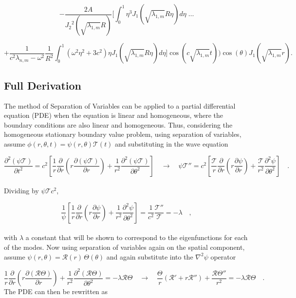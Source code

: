 \documentclass{homework}
\begin{document}
$$ - \frac{2A}{{J_2}^2 \left( \sqrt{\lambda_{1,m}} R \right)}\Bigg[ \int_0^1 \eta^3 J_1 \left( \sqrt{\lambda_{1,m}} R\eta \right) d\eta \; \dots $$

$$ + \frac{1}{c^2 \lambda_{n,m} - \omega^2} \frac{1}{R^2} \int_0^1 \left(\omega^2 \eta^2 + 3c^2 \right) \eta J_1 \left(\sqrt{\lambda_{1,m}} R \eta \right) d\eta \Bigg] \cos \left(c \sqrt{\lambda_{1,m}} t \right) \Biggl) \cos(\theta) J_1 \left(\sqrt{\lambda_{1,m} } r \right) .$$

\subsection{Full Derivation}
\noindent The method of Separation of Variables can be applied to a partial differential equation (PDE) when the equation is linear and homogeneous, where the boundary conditions are also linear and homogeneous. Thus, considering the homogeneous stationary boundary value problem, using separation of variables, assume $\phi(r, \theta, t) = \psi (r, \theta) \mathcal{T} (t)$ and substituting in the wave equation

\[ \frac{\partial^2 (\psi \mathcal{T})}{\partial t^2} = c^2 \left[ \frac{1}{r} \frac{\partial}{\partial r} \left(r \frac{\partial (\psi \mathcal{T})}{\partial r}\right) + \frac{1}{r^2} \frac{\partial^2 (\psi \mathcal{T})}{\partial \theta^2} \right] \quad \rightarrow \quad \psi \mathcal{T}'' = c^2 \left[ \frac{\mathcal{T}}{r} \frac{\partial}{\partial r} \left(r \frac{\partial \psi}{\partial r}\right) + \frac{\mathcal{T}}{r^2} \frac{\partial^2 \psi}{\partial \theta^2} \right] \quad .\]
\\ \noindent
Dividing by $\psi \mathcal{T} c^2$,

\[ \frac{1}{\psi} \left[ \frac{1}{r} \frac{\partial}{\partial r} \left(r \frac{\partial \psi}{\partial r}\right) + \frac{1}{r^2} \frac{\partial^2 \psi}{\partial \theta^2} \right] = \frac{1}{c^2} \frac{\mathcal{T}''}{\mathcal{T}} = - \lambda \quad ,\]
\\ \noindent
with $\lambda$ a constant that will be shown to correspond to the eigenfunctions for each of the modes. Now using separation of variables again on the spatial component, assume $ \psi (r, \theta) = \mathcal{R}(r) \, \Theta(\theta) $ and again substitute into the $\nabla^2 \psi$ operator

\[ \frac{1}{r} \frac{\partial}{\partial r} \left(r \frac{\partial (\mathcal{R} \Theta)}{\partial r}\right) + \frac{1}{r^2} \frac{\partial^2 (\mathcal{R} \Theta)}{\partial \theta^2} = - \lambda \mathcal{R} \Theta \quad \rightarrow \quad \frac{\Theta}{r} (\mathcal{R}' + r \mathcal{R}'') + \frac{\mathcal{R} \Theta''}{r^2} = - \lambda \mathcal{R} \Theta \quad .\]
\noindent
The PDE can then be rewritten as
\end{document}
